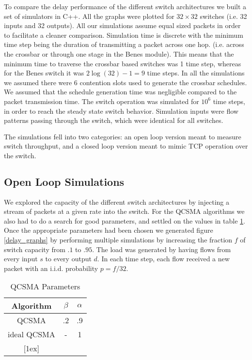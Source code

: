 \documentclass{IEEEtran}%
\begin{document}
To compare the delay performance of the different switch architectures we built a set of simulators in C++.  All the graphs were plotted for $32 \times 32$ switches (i.e. 32 inputs and 32 outputs).  All our simulations assume equal sized packets in order to facilitate a cleaner comparison.  Simulation time is discrete with the minimum time step being the duration of transmitting a packet across one hop. (i.e. across the crossbar or through one stage in the Benes module).  This means that the minimum time to traverse the crossbar based switches was 1 time step, whereas for the Benes switch it was $2\log(32)-1 = 9$ time steps.  In all the simulations we assumed there were $6$ contention slots used to generate the crossbar schedules.  We assumed that the schedule generation time was negligible compared to the packet transmission time.  The switch operation was simulated for $10^6$ time steps, in order to reach the steady state switch behavior.  Simulation inputs were flow patterns passing through the switch, which were identical for all switches. %

 The simulations fell into two categories: an open loop version meant to measure switch throughput, and a closed loop version meant to mimic TCP operation over the switch.  %
 
\subsection{Open Loop Simulations}

We explored the capacity of the different switch architectures by injecting a stream of packets at a given rate into the switch.  For the QCSMA algorithms we also had to do a search for good parameters, and settled on the values in table \ref{qcsma_parameters}.  Once the appropriate parameters had been chosen we generated figure \ref{delay_graphs} by performing multiple simulations by increasing the fraction $f$ of switch capacity from $.1$ to $.95$.  The load was generated by having flows from every input $s$ to every output $d$.  In each time step, each flow received a new packet with an i.i.d. probability $p=f/32$.

\begin{table}[ht] \caption{QCSMA Parameters} 
\centering 
\begin{tabular}{c c c}
 \hline\hline 
 Algorithm & $\beta$ & $\alpha$ \\
  [0.5ex] \hline 
   QCSMA&.2&.9  \\
   ideal  QCSMA&-&1  \\
  [1ex] \hline 
  \end{tabular}
   \label{qcsma_parameters} 
\end{table}
\end{document}
